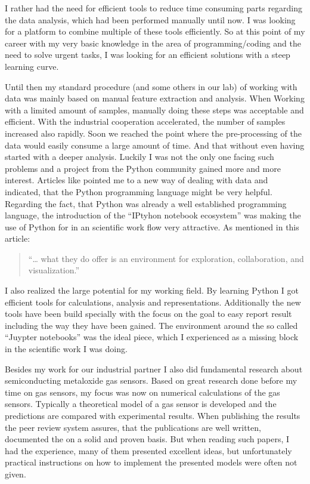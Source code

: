 \documentclass[11pt]{article}
\begin{document}
I rather had the need for efficient tools to reduce time consuming parts
regarding the data analysis, which had been performed manually until
now. I was looking for a platform to combine multiple of these tools
efficiently. So at this point of my career with my very basic knowledge
in the area of programming/coding and the need to solve urgent tasks, I
was looking for an efficient solutions with a steep learning curve.

Until then my standard procedure (and some others in our lab) of working
with data was mainly based on manual feature extraction and analysis.
When Working with a limited amount of samples, manually doing these
steps was acceptable and efficient. With the industrial cooperation
accelerated, the number of samples increased also rapidly. Soon we
reached the point where the pre-processing of the data would easily
consume a large amount of time. And that without even having started
with a deeper analysis. Luckily I was not the only one facing such
problems and a project from the Python community gained more and more
interest. Articles like \cite{Unpingco2014} pointed me to a new way of
dealing with data and indicated, that the Python programming language
might be very helpful. Regarding the fact, that Python was already a
well established programming language, the introduction of the ``IPtyhon
notebook ecosystem'' was making the use of Python for in an scientific
work flow very attractive. As mentioned in this article:
\cite{Osipov2016}

\begin{quote}
``\ldots{} what they do offer is an environment for exploration,
collaboration, and visualization.''
\end{quote}

I also realized the large potential for my working field. By learning
Python I got efficient tools for calculations, analysis and
representations. Additionally the new tools have been build specially
with the focus on the goal to easy report result including the way they
have been gained. The environment around the so called ``Juypter
notebooks'' was the ideal piece, which I experienced as a missing block
in the scientific work I was doing.

Besides my work for our industrial partner I also did fundamental
research about semiconducting metaloxide gas sensors. Based on great
research done before my time on gas sensors, my focus was now on
numerical calculations of the gas sensors. Typically a theoretical model
of a gas sensor is developed and the predictions are compared with
experimental results. When publishing the results the peer review system
assures, that the publications are well written, documented the on a
solid and proven basis. But when reading such papers, I had the
experience, many of them presented excellent ideas, but unfortunately
practical instructions on how to implement the presented models were
often not given.
\end{document}
